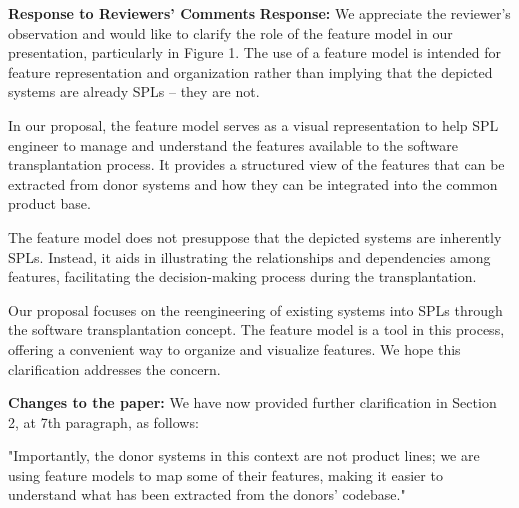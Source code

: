\documentclass[a4paper,11pt]{letter}
\newcounter{reviewer}
\newcommand{\FOUNDRY}{\textsc{Foundry}\xspace}
\newcommand{\response}[1]{\textbf{Response:} \begingroup\color{black}#1\endgroup}
\newcommand{\changes}[1]{\textbf{Changes to the paper:} \begingroup\color{blue}#1\endgroup}
\begin{document}
\begin{letter}{\textbf{Response to Reviewers' Comments}}
\response{We appreciate the reviewer's observation and would like to clarify the role of the feature model in our presentation, particularly in Figure 1. The use of a feature model is intended for feature representation and organization rather than implying that the depicted systems are already SPLs -- they are not.

In our proposal, the feature model serves as a visual representation to help SPL engineer to manage and understand the features available to the software transplantation process. It provides a structured view of the features that can be extracted from donor systems and how they can be integrated into the common product base.

The feature model does not presuppose that the depicted systems are inherently SPLs. Instead, it aids in illustrating the relationships and dependencies among features, facilitating the decision-making process during the transplantation.

Our proposal focuses on the reengineering of existing systems into SPLs through the software transplantation concept. The feature model is a tool in this process, offering a convenient way to organize and visualize features. We hope this clarification addresses the concern.}

\changes{We have now provided further clarification in Section 2, at 7th paragraph, as follows: 

"Importantly, the donor systems in this context are not product lines; we are using feature models to map some of their features, making it easier to understand what has been extracted from the donors' codebase."}





\end{letter}
\end{document}
